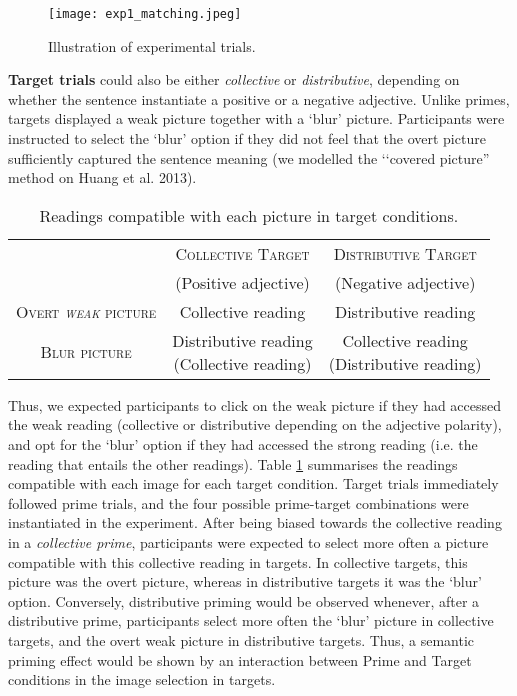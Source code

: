 \documentclass[a4paper, 11pt]{article}
\begin{document}
\begin{figure}[h!]
  \centering
    \texttt{[image: exp1\_matching.jpeg]}
      \caption{Illustration of experimental trials.}
      \label{fig.examples.item.matching}
\end{figure}

\vspace{.5cm}


\noindent \textbf{Target trials} could also be either \textit{collective} or \textit{distributive}, depending on whether the sentence instantiate a positive or a negative adjective. Unlike primes, targets displayed a weak picture together with a `blur' picture. Participants were instructed to select the `blur' option if they did not feel that the overt picture sufficiently captured the sentence meaning (we modelled the ‘‘covered picture” method on Huang et al. 2013). 

\begin{table}[h]
\centering
\begin{tabular}{ccc}
\toprule
& \textsc{Collective Target} & \textsc{Distributive Target} \\
& (Positive adjective) & (Negative adjective) \\
 \cmidrule(r){2-3}
\textsc{Overt \emph{weak} picture} & Collective reading & Distributive reading  \\[0.5cm]
\textsc{Blur picture} & \parbox[c]{3.5cm}{Distributive reading \\ (Collective reading)}&  \parbox[c]{3.7cm}{Collective reading \\ (Distributive reading)}  \\
\bottomrule
\end{tabular}
\caption{Readings compatible with each picture in target conditions.}\label{table:targetreadings}

\end{table}

Thus, we expected participants to click on the weak picture if they had accessed the weak reading (collective or distributive depending on the adjective polarity), and opt for the `blur' option if they had accessed the strong reading (i.e. the reading that entails the other readings). Table \ref{table:targetreadings} summarises the readings compatible with each image for each target condition. Target trials immediately followed prime trials, and the four possible prime-target combinations were instantiated in the experiment. 
After being biased towards the collective reading in a \textit{collective prime}, participants were expected to select more often a picture compatible with this collective reading in targets. In collective targets, this picture was the overt picture, whereas in distributive targets it was the `blur' option. Conversely, distributive priming would be observed whenever, after a distributive prime, participants select more often the `blur' picture in collective targets, and the overt weak picture in distributive targets.  Thus, a semantic priming effect would be shown by an interaction between Prime and Target conditions in the image selection in targets.  
\end{document}
